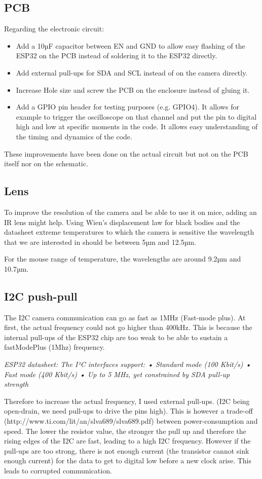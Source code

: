 \documentclass[a4paper]{article}
\begin{document}
\subsection{PCB}
Regarding the electronic circuit:
\begin{itemize}
    \item Add a 10µF capacitor between EN and GND to allow easy flashing of the ESP32 on the PCB instead of soldering it to the ESP32 directly.
    \item Add external pull-ups for SDA and SCL instead of on the camera directly.
    \item Increase Hole size and screw the PCB on the enclosure instead of gluing it.
    \item Add a GPIO pin header for testing purposes (e.g.  GPIO4). It allows for example to trigger the oscilloscope on that channel and put the pin to digital high and low at specific moments in the code. It allows easy understanding of the timing and dynamics of the code.
\end{itemize}
These improvements have been done on the actual circuit but not on the PCB itself nor on the schematic.

\subsection{Lens}
To improve the resolution of the camera and be able to use it on mice, adding an IR lens might help.
Using Wien's displacement law for black bodies and the datasheet extreme temperatures to which the camera is sensitive the wavelength that we are interested in should be between 5µm and 12.5µm.

For the mouse range of temperature, the wavelengths are around 9.2µm and 10.7µm.

\subsection{I2C push-pull}
The I2C camera communication can go as fast as 1MHz (Fast-mode plus). At first, the actual frequency could not go higher than 400kHz. This is because the internal pull-ups of the ESP32 chip are too weak to be able to sustain a fastModePlus (1Mhz) frequency. 


\textit{ESP32 datasheet: The I²C interfaces support: • Standard mode (100 Kbit/s) • Fast mode (400 Kbit/s) • Up to 5 MHz, yet constrained by SDA pull-up strength }

Therefore to increase the actual frequency, I used external pull-ups. (I2C being open-drain, we need pull-ups to drive the pins high).
This is however a trade-off (http://www.ti.com/lit/an/slva689/slva689.pdf) between power-consumption and speed.
The lower the resistor value, the stronger the pull up and therefore the rising edges of the I2C are fast, leading to a high I2C frequency. However if the pull-ups are too strong, there is not enough current (the transistor cannot sink enough current) for the data to get to digital low before a new clock arise. This leads to corrupted communication.
\end{document}
